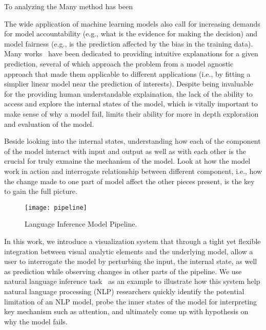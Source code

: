 To analyzing the
Many method has been

The wide application of machine learning models also call for increasing demands for model accountability (e.g., what is the evidence for making the decision) and model fairness (e.g., is the prediction affected by the bias in the training data).
%
Many works~\cite{RibeiroSinghGuestrin2016} have been dedicated to providing intuitive explanations for a given prediction, several of which approach the problem from a model agnostic approach that made them applicable to different applications (i.e., by fitting a simplier linear model near the prediction of interests).
%
Despite being invaluable for the providing human understandable explaination, the lack of the ability to access and explore the internal states of the model, which is vitally important to make sense of why a model fail, limits their ability for more in depth exploration and evaluation of the model.


Beside looking into the internal states, understanding how each of the component of the model interact with input and output as well as with each other is the crucial for truly exmaine the mechanism of the model.
%
Look at how the model work in action and interrogate relationship between different component, i.e., how the change made to one part of model affect the other pieces present, is the key to gain the full picture.

\begin{figure}[htbp]
\centering
\vspace{-2mm}
 \texttt{[image: pipeline]}
 \caption{Language Inference Model Pipeline.}
\label{fig:projTransition}
\vspace{-5mm}
\end{figure}

In this work, we introduce a visualization system that through a tight yet flexible integration between visual analytic elements and the underlying model, allow a user to interrogate the model by perturbing the input, the internal state, as well as prediction while observing changes in other parts of the pipeline.
We use natural language inference task~\cite{BowmanAngeliPotts2015} as an example to illustrate how this system help natural language processing (NLP) researchers quickly identify the potential limitation of an NLP model, probe the inner states of the model for interpreting key mechanism such as attention, and ultimately come up with hypothesis on why the model fails.

